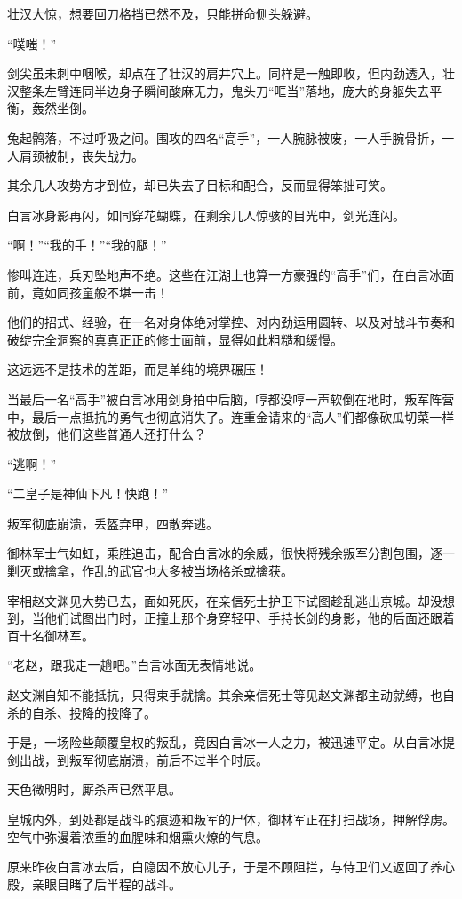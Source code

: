 壮汉大惊，想要回刀格挡已然不及，只能拼命侧头躲避。

“噗嗤！”

剑尖虽未刺中咽喉，却点在了壮汉的肩井穴上。同样是一触即收，但内劲透入，壮汉整条左臂连同半边身子瞬间酸麻无力，鬼头刀“哐当”落地，庞大的身躯失去平衡，轰然坐倒。

兔起鹘落，不过呼吸之间。围攻的四名“高手”，一人腕脉被废，一人手腕骨折，一人肩颈被制，丧失战力。

其余几人攻势方才到位，却已失去了目标和配合，反而显得笨拙可笑。

白言冰身影再闪，如同穿花蝴蝶，在剩余几人惊骇的目光中，剑光连闪。

“啊！”“我的手！”“我的腿！”

惨叫连连，兵刃坠地声不绝。这些在江湖上也算一方豪强的“高手”们，在白言冰面前，竟如同孩童般不堪一击！

他们的招式、经验，在一名对身体绝对掌控、对内劲运用圆转、以及对战斗节奏和破绽完全洞察的真真正正的修士面前，显得如此粗糙和缓慢。

这远远不是技术的差距，而是单纯的境界碾压！

当最后一名“高手”被白言冰用剑身拍中后脑，哼都没哼一声软倒在地时，叛军阵营中，最后一点抵抗的勇气也彻底消失了。连重金请来的“高人”们都像砍瓜切菜一样被放倒，他们这些普通人还打什么？

“逃啊！”

“二皇子是神仙下凡！快跑！”

叛军彻底崩溃，丢盔弃甲，四散奔逃。

御林军士气如虹，乘胜追击，配合白言冰的余威，很快将残余叛军分割包围，逐一剿灭或擒拿，作乱的武官也大多被当场格杀或擒获。

宰相赵文渊见大势已去，面如死灰，在亲信死士护卫下试图趁乱逃出京城。却没想到，当他们试图出门时，正撞上那个身穿轻甲、手持长剑的身影，他的后面还跟着百十名御林军。

“老赵，跟我走一趟吧。”白言冰面无表情地说。

赵文渊自知不能抵抗，只得束手就擒。其余亲信死士等见赵文渊都主动就缚，也自杀的自杀、投降的投降了。

于是，一场险些颠覆皇权的叛乱，竟因白言冰一人之力，被迅速平定。从白言冰提剑出战，到叛军彻底崩溃，前后不过半个时辰。

天色微明时，厮杀声已然平息。

皇城内外，到处都是战斗的痕迹和叛军的尸体，御林军正在打扫战场，押解俘虏。空气中弥漫着浓重的血腥味和烟熏火燎的气息。

原来昨夜白言冰去后，白隐因不放心儿子，于是不顾阻拦，与侍卫们又返回了养心殿，亲眼目睹了后半程的战斗。

